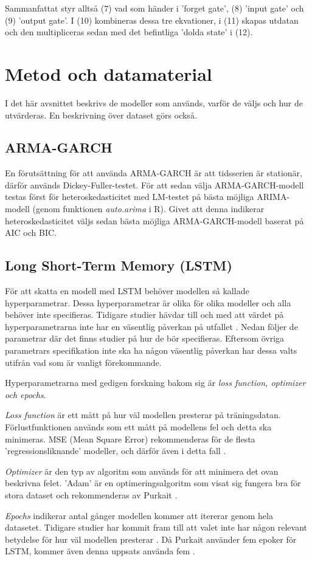 \documentclass[12pt]{article}
\begin{document}
Sammanfattat styr alltså (7) vad som händer i 'forget gate', (8) 'input gate' och (9) 'output gate'. I (10) kombineras dessa tre ekvationer, i (11) skapas utdatan och den multipliceras sedan med det befintliga 'dolda state' i (12). 


\newpage
\section{Metod och datamaterial}
I det här avsnittet beskrivs de modeller som används, varför de väljs och hur de utvärderas. En beskrivning över dataset görs också. 
\subsection{ARMA-GARCH}
En förutsättning för att använda ARMA-GARCH är att tidsserien är stationär, därför används Dickey-Fuller-testet. För att sedan välja ARMA-GARCH-modell testas först för heteroskedasticitet med LM-testet på bästa möjliga ARIMA-modell (genom funktionen \textit{auto.arima} i R). Givet att denna indikerar heteroskedasticitet väljs sedan bästa möjliga ARMA-GARCH-modell baserat på AIC och BIC. 

\subsection{Long Short-Term Memory (LSTM)}
För att skatta en modell med LSTM behöver modellen så kallade hyperparametrar. Dessa hyperparametrar är olika för olika modeller och alla behöver inte specifieras. Tidigare studier hävdar till och med att värdet på hyperparametrarna inte har en väsentlig påverkan på utfallet \parencite{dreyfus2005neural}. Nedan följer de parametrar där det finns studier på hur de bör specifieras. Eftersom övriga parametrars specifikation inte ska ha någon väsentlig påverkan har dessa valts utifrån vad som är vanligt förekommande.

Hyperparametrarna med gedigen forskning bakom sig är \emph{loss function, optimizer och epochs}. \par
\emph{Loss function} är ett mått på hur väl modellen presterar på träningsdatan. Förlustfunktionen används som ett mått på modellens fel och detta ska minimeras. MSE (Mean Square Error) rekommenderas för de flesta 'regressionsliknande' modeller, och därför även i detta fall \parencite{purkait2019hands}. \par
\emph{Optimizer} är den typ av algoritm som används för att minimera det ovan beskrivna felet. 'Adam' är en optimeringsalgoritm som visat sig fungera bra för stora dataset och rekommenderas av Purkait \parencite{purkait2019hands}. \par
\emph{Epochs} indikerar antal gånger modellen kommer att itererar genom hela datasetet. Tidigare studier har kommit fram till att valet inte har någon relevant betydelse för hur väl modellen presterar \parencite{siami2018forecasting}. Då Purkait använder fem epoker för LSTM, kommer även denna uppsats använda fem \parencite{purkait2019hands}. \par
\end{document}

